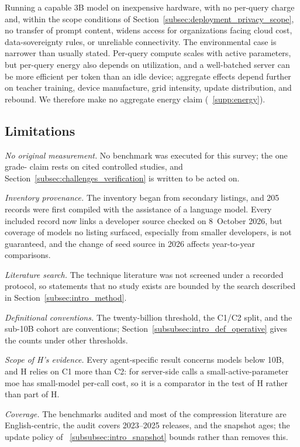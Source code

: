 Running a capable 3B model on inexpensive hardware, with no per-query charge and, within the scope conditions of Section~\ref{subsec:deployment_privacy_scope}, no transfer of prompt content, widens access for organizations facing cloud cost, data-sovereignty rules, or unreliable connectivity. The environmental case is narrower than usually stated. Per-query compute scales with active parameters, but per-query energy also depends on utilization, and a well-batched server can be more efficient per token than an idle device; aggregate effects depend further on teacher training, device manufacture, grid intensity, update distribution, and rebound. We therefore make no aggregate energy claim (\suppsec~\ref{supp:energy}).

\subsection{Limitations}
\label{subsec:discussion_limitations}

\emph{No original measurement.} No benchmark was executed for this survey; the one grade-\evA{} claim rests on cited controlled studies, and Section~\ref{subsec:challenges_verification} is written to be acted on.

\emph{Inventory provenance.} The inventory began from secondary listings, and 205 records were first compiled with the assistance of a language model. Every included record now links a developer source checked on 8~October 2026, but coverage of models no listing surfaced, especially from smaller developers, is not guaranteed, and the change of seed source in 2026 affects year-to-year comparisons.

\emph{Literature search.} The technique literature was not screened under a recorded protocol, so statements that no study exists are bounded by the search described in Section~\ref{subsec:intro_method}.

\emph{Definitional conventions.} The twenty-billion threshold, the C1/C2 split, and the sub-10B cohort are conventions; Section~\ref{subsubsec:intro_def_operative} gives the counts under other thresholds.

\emph{Scope of H's evidence.} Every agent-specific result concerns models below 10B, and H relies on C1 more than C2: for server-side calls a small-active-parameter \gls{moe} has small-model per-call cost, so it is a comparator in the test of H rather than part of H.

\emph{Coverage.} The benchmarks audited and most of the compression literature are English-centric, the audit covers 2023--2025 releases, and the snapshot ages; the update policy of \suppsec~\ref{subsubsec:intro_snapshot} bounds rather than removes this.

